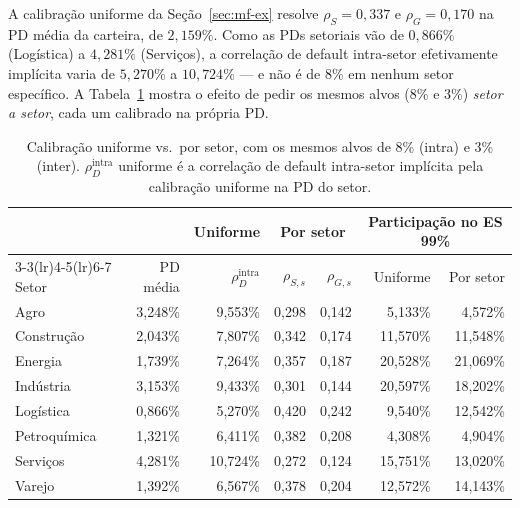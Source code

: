 \documentclass[11pt,a4paper]{article}
\begin{document}
A calibração uniforme da Seção~\ref{sec:mf-ex} resolve $\rho_S=0{,}337$ e $\rho_G=0{,}170$ na PD média da carteira, de $2{,}159\%$. Como as PDs setoriais vão de $0{,}866\%$ (Logística) a $4{,}281\%$ (Serviços), a correlação de default intra-setor efetivamente implícita varia de $5{,}270\%$ a $10{,}724\%$ --- e não é de 8\% em nenhum setor específico. A Tabela~\ref{tab:mf-setor-ex} mostra o efeito de pedir os mesmos alvos (8\% e 3\%) \emph{setor a setor}, cada um calibrado na própria PD.

\begin{table}[H]
\centering\small
\caption{Calibração uniforme vs.\ por setor, com os mesmos alvos de 8\% (intra) e 3\% (inter). $\rho_D^{\mathrm{intra}}$ uniforme é a correlação de default intra-setor implícita pela calibração uniforme na PD do setor.}
\label{tab:mf-setor-ex}
\setlength{\tabcolsep}{4pt}
\begin{tabular}{lrrrrrr}
\toprule
& & \multicolumn{1}{c}{Uniforme} & \multicolumn{2}{c}{Por setor} & \multicolumn{2}{c}{Participação no ES 99\%}\\
\cmidrule(lr){3-3}\cmidrule(lr){4-5}\cmidrule(lr){6-7}
Setor & PD média & $\rho_D^{\mathrm{intra}}$ & $\rho_{S,s}$ & $\rho_{G,s}$ & Uniforme & Por setor\\
\midrule
Agro         & 3{,}248\% & 9{,}553\%  & 0{,}298 & 0{,}142 & 5{,}133\%  & 4{,}572\% \\
Construção   & 2{,}043\% & 7{,}807\%  & 0{,}342 & 0{,}174 & 11{,}570\% & 11{,}548\% \\
Energia      & 1{,}739\% & 7{,}264\%  & 0{,}357 & 0{,}187 & 20{,}528\% & 21{,}069\% \\
Indústria    & 3{,}153\% & 9{,}433\%  & 0{,}301 & 0{,}144 & 20{,}597\% & 18{,}202\% \\
Logística    & 0{,}866\% & 5{,}270\%  & 0{,}420 & 0{,}242 & 9{,}540\%  & 12{,}542\% \\
Petroquímica & 1{,}321\% & 6{,}411\%  & 0{,}382 & 0{,}208 & 4{,}308\%  & 4{,}904\% \\
Serviços     & 4{,}281\% & 10{,}724\% & 0{,}272 & 0{,}124 & 15{,}751\% & 13{,}020\% \\
Varejo       & 1{,}392\% & 6{,}567\%  & 0{,}378 & 0{,}204 & 12{,}572\% & 14{,}143\% \\
\bottomrule
\end{tabular}
\end{table}
\end{document}
